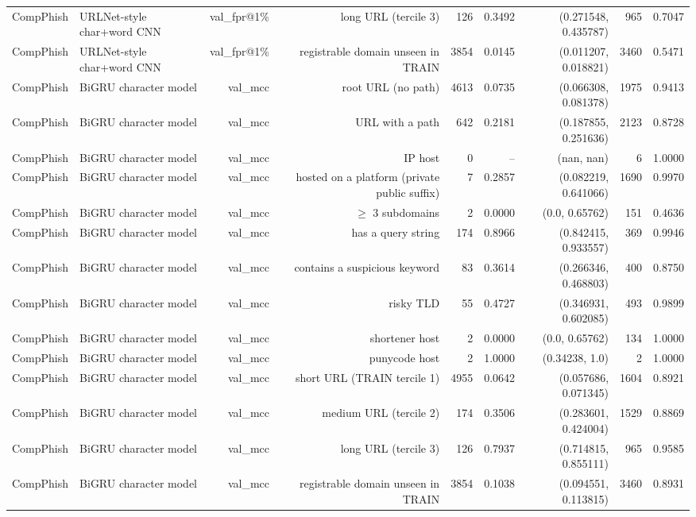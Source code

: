 \begin{table}[t]
\begin{tabular}{llrrrrrrr}
CompPhish & URLNet-style char+word CNN & val\_fpr@1\% & long URL (tercile 3) & 126 & 0.3492 & (0.271548, 0.435787) & 965 & 0.7047 \\
CompPhish & URLNet-style char+word CNN & val\_fpr@1\% & registrable domain unseen in TRAIN & 3854 & 0.0145 & (0.011207, 0.018821) & 3460 & 0.5471 \\
CompPhish & BiGRU character model & val\_mcc & root URL (no path) & 4613 & 0.0735 & (0.066308, 0.081378) & 1975 & 0.9413 \\
CompPhish & BiGRU character model & val\_mcc & URL with a path & 642 & 0.2181 & (0.187855, 0.251636) & 2123 & 0.8728 \\
CompPhish & BiGRU character model & val\_mcc & IP host & 0 & -- & (nan, nan) & 6 & 1.0000 \\
CompPhish & BiGRU character model & val\_mcc & hosted on a platform (private public suffix) & 7 & 0.2857 & (0.082219, 0.641066) & 1690 & 0.9970 \\
CompPhish & BiGRU character model & val\_mcc & $\geq$ 3 subdomains & 2 & 0.0000 & (0.0, 0.65762) & 151 & 0.4636 \\
CompPhish & BiGRU character model & val\_mcc & has a query string & 174 & 0.8966 & (0.842415, 0.933557) & 369 & 0.9946 \\
CompPhish & BiGRU character model & val\_mcc & contains a suspicious keyword & 83 & 0.3614 & (0.266346, 0.468803) & 400 & 0.8750 \\
CompPhish & BiGRU character model & val\_mcc & risky TLD & 55 & 0.4727 & (0.346931, 0.602085) & 493 & 0.9899 \\
CompPhish & BiGRU character model & val\_mcc & shortener host & 2 & 0.0000 & (0.0, 0.65762) & 134 & 1.0000 \\
CompPhish & BiGRU character model & val\_mcc & punycode host & 2 & 1.0000 & (0.34238, 1.0) & 2 & 1.0000 \\
CompPhish & BiGRU character model & val\_mcc & short URL (TRAIN tercile 1) & 4955 & 0.0642 & (0.057686, 0.071345) & 1604 & 0.8921 \\
CompPhish & BiGRU character model & val\_mcc & medium URL (tercile 2) & 174 & 0.3506 & (0.283601, 0.424004) & 1529 & 0.8869 \\
CompPhish & BiGRU character model & val\_mcc & long URL (tercile 3) & 126 & 0.7937 & (0.714815, 0.855111) & 965 & 0.9585 \\
CompPhish & BiGRU character model & val\_mcc & registrable domain unseen in TRAIN & 3854 & 0.1038 & (0.094551, 0.113815) & 3460 & 0.8931 \\

\end{tabular}
\end{table}
